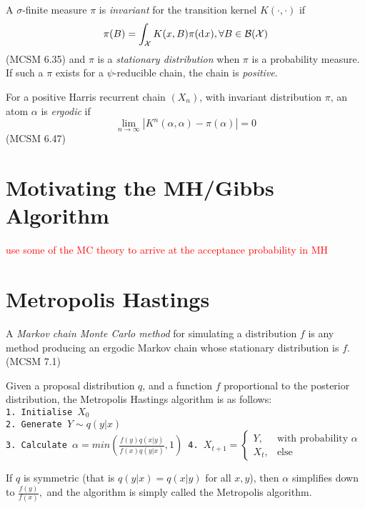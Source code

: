 \begin{definition}
    A $\sigma$-finite measure $\pi$ is \emph{invariant} for the transition kernel $K(\cdot,\cdot)$ if $$\pi(B) = \int_\mathcal{X} K(x, B)\pi(\diff x), \forall B\in\mathcal{B}(\mathcal{X})$$ (MCSM 6.35) and $\pi$ is a \emph{stationary distribution} when $\pi$ is a probability measure. If such a $\pi$ exists for a $\psi$-reducible chain, the chain is \emph{positive}.
\end{definition}

\begin{definition}[Ergodic]
    For a positive Harris recurrent chain $(X_n)$, with invariant distribution $\pi$, an atom $\alpha$ is \emph{ergodic} if
    $$\lim_{n\to\infty}|K^n(\alpha, \alpha) - \pi(\alpha)| = 0$$ (MCSM 6.47)
\end{definition}

\color{black}

\section{Motivating the MH/Gibbs Algorithm}
\textcolor{red}{use some of the MC theory to arrive at the acceptance probability in MH}

\section{Metropolis Hastings}

\begin{definition}
    A \emph{Markov chain Monte Carlo method} for simulating a distribution $f$ is any method producing an ergodic Markov chain whose stationary distribution is $f$. (MCSM 7.1)
\end{definition}

Given a proposal distribution $q$, and a function $f$ proportional to the posterior distribution, the Metropolis Hastings algorithm is as follows: \texttt{\\
    1. Initialise $X_0$\\
    2. Generate $Y \sim q(y|x)$\\
    3. Calculate $\alpha =
        min\left(\frac{f(y)q(x|y)}{f(x)q(y|x)}, 1\right)$
    4. $X_{t+1} = \begin{cases} Y, & \text{with probability } \alpha\\ X_{t},& \text{else}\end{cases}$
}

If $q$ is symmetric (that is $q(y|x) = q(x|y)$ for all $x, y$), then $\alpha$ simplifies down to $\frac{f(y)}{f(x)},$ and the algorithm is simply called the Metropolis algorithm.

